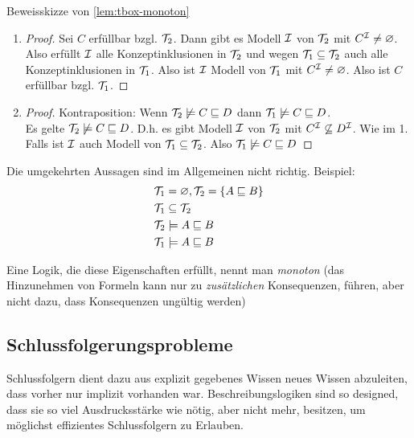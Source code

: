 \begin{tafel}[Beweisskizze]Beweisskizze von \autoref{lem:tbox-monoton}
\begin{enumerate}
  \item \begin{proof} Sei $C$ erfüllbar bzgl. $\mathcal{T}_{2}$. Dann gibt es Modell $\mathcal{I}$ von $\mathcal{T}_{2}$ mit $C^{\mathcal{I}} \neq \varnothing$. Also erfüllt $\mathcal{I}$ alle Konzeptinklusionen in $\mathcal{T}_{2}$ und wegen $\mathcal{T}_{1} \subseteq \mathcal{T}_{2}$ auch alle Konzeptinklusionen in $\mathcal{T}_{1}$. Also ist $\mathcal{I}$ Modell von $\mathcal{T}_1$ mit $C^{\mathcal{I}} \neq \varnothing$. Also ist $C$ erfüllbar bzgl. $\mathcal{T}_1$. \end{proof}
  \item \begin{proof} Kontraposition: Wenn $\mathcal{T}_2 \not\models C \sqsubseteq D$ dann $\mathcal{T}_1 \not\models C \sqsubseteq D$. \\
  Es gelte $\mathcal{T}_2 \not\models C \sqsubseteq D$. D.h. es gibt Modell $\mathcal{I}$ von $\mathcal{T}_2$ mit $C^{\mathcal{I}} \not\subseteq D^{\mathcal{I}}$. Wie im 1. Falls ist $\mathcal{I}$ auch Modell von $\mathcal{T}_1 \subseteq \mathcal{T}_2$. Also $\mathcal{T}_1 \not\models C \sqsubseteq D$\end{proof}
\end{enumerate}

Die umgekehrten Aussagen sind im Allgemeinen nicht richtig. Beispiel:
\begin{align*}
    &\mathcal{T}_1 = \varnothing, \mathcal{T}_2 = \{A \sqsubseteq B\}\\
    &\mathcal{T}_1 \subseteq \mathcal{T}_2 \\
    &\mathcal{T}_2 \models A \sqsubseteq B\\
    &\mathcal{T}_1 \models A \sqsubseteq B
\end{align*}
\end{tafel}

Eine Logik, die diese Eigenschaften erfüllt, nennt man \emph{monoton} (das Hinzunehmen von Formeln kann nur zu \emph{zusätzlichen} Konsequenzen, führen, aber nicht dazu, dass Konsequenzen ungültig werden)

\subsection{Schlussfolgerungsprobleme}\label{schlussfolgerungsprobleme}

Schlussfolgern dient dazu aus explizit gegebenes Wissen neues Wissen abzuleiten, dass vorher nur implizit vorhanden war. Beschreibungslogiken sind so designed, dass sie so viel Ausdrucksstärke wie nötig, aber nicht mehr, besitzen, um möglichst effizientes Schlussfolgern zu Erlauben.

